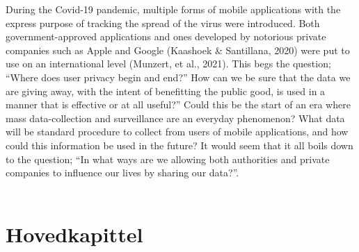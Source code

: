 \documentclass[11pt]{article}
\begin{document}
During the Covid-19 pandemic, multiple forms of mobile applications with the express purpose of tracking the spread of the virus were introduced. Both government-approved applications and ones developed by notorious private companies such as Apple and Google (Kaashoek \& Santillana, 2020) were put to use on an international level (Munzert, et al., 2021). This begs the question; “Where does user privacy begin and end?” How can we be sure that the data we are giving away, with the intent of benefitting the public good, is used in a manner that is effective or at all useful?” Could this be the start of an era where mass data-collection and surveillance are an everyday phenomenon? What data will be standard procedure to collect from users of mobile applications, and how could this information be used in the future? It would seem that it all boils down to the question; “In what ways are we allowing both authorities and private companies to influence our lives by sharing our data?”. 
\\ \\

\section{Hovedkapittel}
\end{document}
